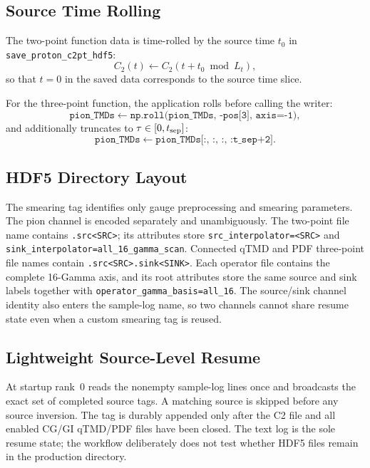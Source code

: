 \documentclass[11pt,a4paper]{article}
\begin{document}
\subsection{Source Time Rolling}

The two-point function data is time-rolled by the source time $t_0$ in
\verb|save_proton_c2pt_hdf5|:
\begin{equation}
  C_2(t) \leftarrow C_2(t + t_0 \bmod L_t),
\end{equation}
so that $t=0$ in the saved data corresponds to the source time slice.

For the three-point function, the application rolls before calling the writer:
\begin{equation}
  \texttt{pion\_TMDs} \leftarrow
  \texttt{np.roll(pion\_TMDs, -pos[3], axis=-1)},
\end{equation}
and additionally truncates to $\tau \in [0, t_{\rm sep}]$:
\begin{equation}
  \texttt{pion\_TMDs} \leftarrow
  \texttt{pion\_TMDs[:, :, :, :t\_sep+2]}.
\end{equation}

\subsection{HDF5 Directory Layout}

The smearing tag identifies only gauge preprocessing and smearing parameters.
The pion channel is encoded separately and unambiguously.  The two-point file
name contains \texttt{.src<SRC>}; its attributes store
\texttt{src\_interpolator=<SRC>} and
\texttt{sink\_interpolator=all\_16\_gamma\_scan}.  Connected qTMD and PDF
three-point file names contain
\texttt{.src<SRC>.sink<SINK>}.  Each operator file contains the complete
16-Gamma axis, and its root attributes store the same source and sink labels
together with \texttt{operator\_gamma\_basis=all\_16}.  The
source/sink channel identity also enters the sample-log name, so two channels
cannot share resume state even when a custom smearing tag is reused.

\subsection{Lightweight Source-Level Resume}

At startup rank~0 reads the nonempty sample-log lines once and broadcasts the
exact set of completed source tags.  A matching source is skipped before any
source inversion.  The tag is durably appended only after the C2 file and all
enabled CG/GI qTMD/PDF files have been closed.  The text log is the sole resume
state; the workflow deliberately does not test whether HDF5 files remain in the
production directory.
\end{document}
